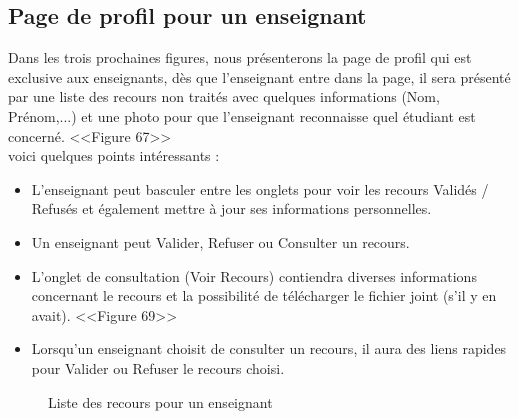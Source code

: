 \documentclass[12pt]{report}
\begin{document}
\newpage

\vspace*{-0.6in}
\subsection{Page de profil pour un enseignant}

Dans les trois prochaines figures, nous présenterons la page de profil qui est exclusive aux enseignants, dès que l'enseignant entre dans la page, il sera présenté par une liste des recours non traités avec quelques informations (Nom, Prénom,...) et une photo pour que l'enseignant reconnaisse quel étudiant est concerné. <<Figure 67>>
\\
voici quelques points intéressants :

\vspace{-0.05in}
\begin{itemize}
  \item L'enseignant peut basculer entre les onglets pour voir les recours Validés / Refusés et également mettre à jour ses informations personnelles.
  \item Un enseignant peut Valider, Refuser ou Consulter un recours.
  \item L'onglet de consultation (Voir Recours) contiendra diverses informations concernant le recours et la possibilité de télécharger le fichier joint (s'il y en avait). <<Figure 69>>
  \item Lorsqu'un enseignant choisit de consulter un recours, il aura des liens rapides pour Valider ou Refuser le recours choisi.
\end{itemize}

\vspace{0.4in}

\begin{figure}[h]
\centering
\caption{Liste des recours pour un enseignant}
\end{figure}
\end{document}
